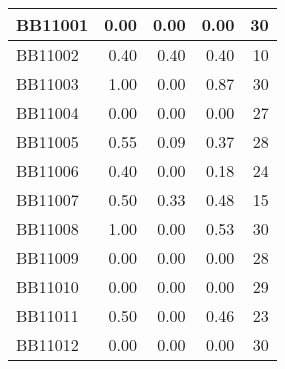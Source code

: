 \begin{longtable}{|l|r|r|r||r|}
	BB11001 & \cellcolor[rgb]{ .988,  1,  .992}0.00 & \cellcolor[rgb]{ .988,  1,  .992}0.00 & \cellcolor[rgb]{ .988,  1,  .992}0.00 & \cellcolor[rgb]{ .973,  .412,  .42}30 \\
	\hline
	BB11002 & \cellcolor[rgb]{ .988,  1,  .992}0.40 & \cellcolor[rgb]{ .988,  1,  .992}0.40 & \cellcolor[rgb]{ .988,  1,  .992}0.40 & \cellcolor[rgb]{ .984,  .796,  .808}10 \\
	\hline
	BB11003 & \cellcolor[rgb]{ .988,  1,  .992}1.00 & \cellcolor[rgb]{ .384,  .745,  .478}0.00 & \cellcolor[rgb]{ .906,  .965,  .922}0.87 & \cellcolor[rgb]{ .973,  .412,  .42}30 \\
	\hline
	BB11004 & \cellcolor[rgb]{ .988,  1,  .992}0.00 & \cellcolor[rgb]{ .988,  1,  .992}0.00 & \cellcolor[rgb]{ .988,  1,  .992}0.00 & \cellcolor[rgb]{ .976,  .471,  .478}27 \\
	\hline
	BB11005 & \cellcolor[rgb]{ .988,  1,  .992}0.55 & \cellcolor[rgb]{ .384,  .745,  .478}0.09 & \cellcolor[rgb]{ .753,  .898,  .792}0.37 & \cellcolor[rgb]{ .976,  .451,  .459}28 \\
	\hline
	BB11006 & \cellcolor[rgb]{ .988,  1,  .992}0.40 & \cellcolor[rgb]{ .384,  .745,  .478}0.00 & \cellcolor[rgb]{ .647,  .855,  .702}0.18 & \cellcolor[rgb]{ .976,  .529,  .537}24 \\
	\hline
	BB11007 & \cellcolor[rgb]{ .988,  1,  .992}0.50 & \cellcolor[rgb]{ .384,  .745,  .478}0.33 & \cellcolor[rgb]{ .906,  .965,  .922}0.48 & \cellcolor[rgb]{ .98,  .702,  .71}15 \\
	\hline
	BB11008 & \cellcolor[rgb]{ .988,  1,  .992}1.00 & \cellcolor[rgb]{ .384,  .745,  .478}0.00 & \cellcolor[rgb]{ .706,  .878,  .749}0.53 & \cellcolor[rgb]{ .973,  .412,  .42}30 \\
	\hline
	BB11009 & \cellcolor[rgb]{ .988,  1,  .992}0.00 & \cellcolor[rgb]{ .988,  1,  .992}0.00 & \cellcolor[rgb]{ .988,  1,  .992}0.00 & \cellcolor[rgb]{ .976,  .451,  .459}28 \\
	\hline
	BB11010 & \cellcolor[rgb]{ .988,  1,  .992}0.00 & \cellcolor[rgb]{ .988,  1,  .992}0.00 & \cellcolor[rgb]{ .988,  1,  .992}0.00 & \cellcolor[rgb]{ .976,  .431,  .439}29 \\
	\hline
	BB11011 & \cellcolor[rgb]{ .988,  1,  .992}0.50 & \cellcolor[rgb]{ .384,  .745,  .478}0.00 & \cellcolor[rgb]{ .933,  .976,  .945}0.46 & \cellcolor[rgb]{ .976,  .549,  .557}23 \\
	\hline
	BB11012 & \cellcolor[rgb]{ .988,  1,  .992}0.00 & \cellcolor[rgb]{ .988,  1,  .992}0.00 & \cellcolor[rgb]{ .988,  1,  .992}0.00 & \cellcolor[rgb]{ .973,  .412,  .42}30 \\

\end{longtable}
